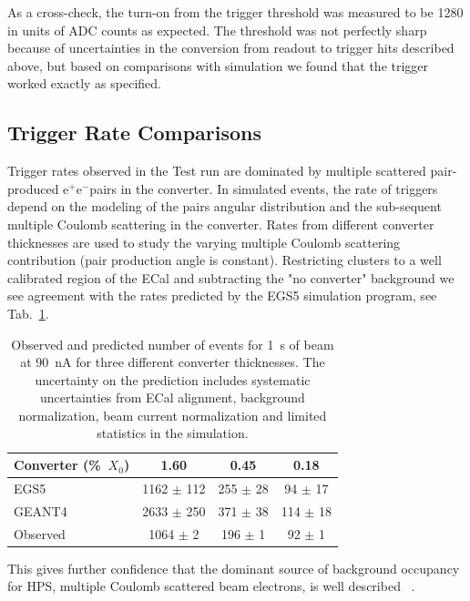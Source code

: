 \documentclass[final,3p,times,twocolumn]{elsarticle}
\newcommand{\ee}{e$^+$e$^-$}
\newcommand{\egs}{{\sc EGS5}}
\newcommand{\moliere}{Moli\`{e}re}
\begin{document}
As a cross-check, the turn-on from the trigger threshold was measured to be 1280 in units of ADC counts 
as expected. The threshold was not perfectly sharp because of uncertainties in the conversion from 
readout to trigger hits described above, but based on comparisons with simulation we found that the 
trigger worked exactly as specified.


\subsection{Trigger Rate Comparisons}
\label{sec:mcs}
Trigger rates observed in the Test run are dominated by multiple scattered pair-produced \ee pairs in the 
converter. In simulated events, the rate of triggers depend on the modeling of the pairs angular distribution 
and the sub-sequent multiple Coulomb scattering in the converter. Rates from different converter 
thicknesses are used to study the varying multiple Coulomb scattering contribution (pair production 
angle is constant). Restricting clusters to a well calibrated region of the ECal and subtracting the 
"no converter" background we see agreement with the rates predicted by the \egs{} simulation 
program, see Tab.~\ref{tab:mcs}.
\begin{table}
{\small
\begin{tabular}{|l|c|c|c|}
\hline
\bf Converter (\%~$X_0$) & \bf 1.60 & \bf 0.45 &	\bf 0.18 \\
\hline
EGS5 &	1162 $\pm$ 112 &	255 $\pm$ 28 &	94 $\pm$ 17	\\
\hline
GEANT4 & 2633 $\pm$ 250 & 	371 $\pm$ 38 &	114 $\pm$ 18 \\
\hline
Observed 	& 1064 $\pm$ 2 & 196 $\pm$ 1 &	92 $\pm$ 1 \\						
\hline
\end{tabular}
\caption{ Observed and predicted number of events for 1~s of beam at 90~nA for three different converter 
thicknesses. The uncertainty on the prediction includes systematic uncertainties from ECal alignment, background normalization, beam current normalization and limited statistics in the simulation.}
}
\label{tab:mcs}
\end{table}
This gives further confidence that the dominant source of background occupancy for HPS, multiple 
Coulomb scattered beam electrons, is well 
described~\cite{Attwood:2005zz,Shen:1978ha,Gottschalk1993467} . 
\end{document}
